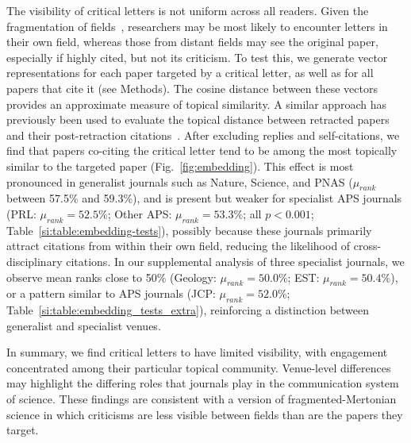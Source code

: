 \documentclass[12pt,a4paper]{article}
\numberwithin{equation}{section}
\def\methods{Methods}
\begin{document}
The visibility of critical letters is not uniform across all readers.
Given the fragmentation of fields~\cite{leydesdorff2001sociological}, researchers may be most likely to encounter letters in their own field, whereas those from distant fields may see the original paper, especially if highly cited, but not its criticism. 
To test this, we generate vector representations for each paper targeted by a critical letter, as well as for all papers that cite it (see \methods).
The cosine distance between these vectors provides an approximate measure of topical similarity.
A similar approach has previously been used to evaluate the topical distance between retracted papers and their post-retraction citations~\cite{woo_2024_retractions}.
After excluding replies and self-citations, we find that papers co-citing the critical letter tend to be among the most topically similar to the targeted paper (Fig.~\ref*{fig:embedding}).
This effect is most pronounced in generalist journals such as Nature, Science, and PNAS ($\mu_{rank}$ between 57.5\% and 59.3\%), and is present but weaker for specialist APS journals (PRL: $\mu_{rank} = 52.5\%$; Other APS: $\mu_{rank} = 53.3\%$; all $p < 0.001$; Table~\ref*{si:table:embedding-tests}), possibly because these journals primarily attract citations from within their own field, reducing the likelihood of cross-disciplinary citations.
In our supplemental analysis of three specialist journals, we observe mean ranks close to 50\% (Geology: $\mu_{rank} = 50.0\%$; EST: $\mu_{rank} = 50.4\%$), or a pattern similar to APS journals (JCP: $\mu_{rank} = 52.0\%$; Table~\ref*{si:table:embedding_tests_extra}), reinforcing a distinction between generalist and specialist venues. 

In summary, we find critical letters to have limited visibility, with engagement concentrated among their particular topical community.
Venue-level differences may highlight the differing roles that journals play in the communication system of science.
These findings are consistent with a version of fragmented-Mertonian science in which criticisms are less visible between fields than are the papers they target. 
\end{document}
